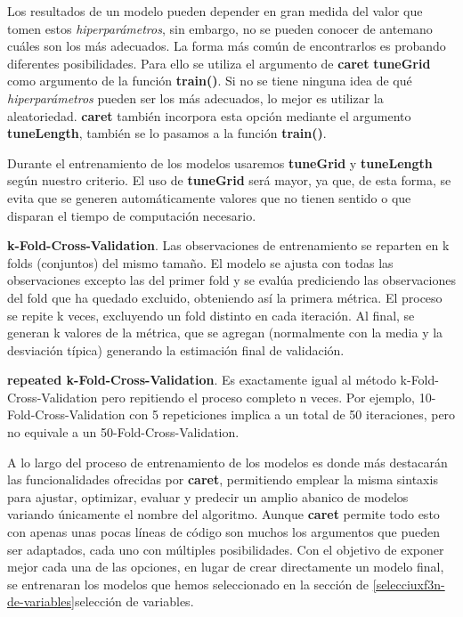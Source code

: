 \documentclass[]{article}
\begin{document}
Los resultados de un modelo pueden depender en gran medida del valor que
tomen estos \emph{hiperparámetros}, sin embargo, no se pueden conocer de
antemano cuáles son los más adecuados. La forma más común de encontrarlos 
es probando diferentes posibilidades. Para ello se
utiliza el argumento de \textbf{caret} \textbf{tuneGrid} como argumento de la función
\textbf{train()}. Si no se tiene ninguna idea de qué 
\emph{hiperparámetros} pueden ser los más adecuados, lo mejor es utilizar la
aleatoriedad. \textbf{caret} también incorpora esta opción mediante el
argumento \textbf{tuneLength}, también se lo pasamos a la función
\textbf{train()}.

Durante el entrenamiento de los modelos usaremos \textbf{tuneGrid} 
y \textbf{tuneLength} según nuestro criterio. El uso de \textbf{tuneGrid} será mayor, ya
que, de esta forma, se evita que se generen automáticamente valores que
no tienen sentido o que disparan el tiempo de computación necesario.

\begin{tcolorbox}
	\textbf{k-Fold-Cross-Validation}. Las observaciones de entrenamiento
	se reparten en k folds (conjuntos) del mismo tamaño. El modelo se ajusta
	con todas las observaciones excepto las del primer fold y se evalúa
	prediciendo las observaciones del fold que ha quedado excluido,
	obteniendo así la primera métrica. El proceso se repite k veces,
	excluyendo un fold distinto en cada iteración. Al final, se generan k
	valores de la métrica, que se agregan (normalmente con la media y la
	desviación típica) generando la estimación final de validación.	
\end{tcolorbox}

\begin{tcolorbox}
	\textbf{repeated k-Fold-Cross-Validation}. Es exactamente
	igual al método k-Fold-Cross-Validation pero repitiendo el proceso
	completo n veces. Por ejemplo, 10-Fold-Cross-Validation con 5
	repeticiones implica a un total de 50 iteraciones,
	pero no equivale a un 50-Fold-Cross-Validation.
\end{tcolorbox}

A lo largo del proceso de entrenamiento de los modelos es donde más destacarán las
funcionalidades ofrecidas por \textbf{caret}, permitiendo emplear la
misma sintaxis para ajustar, optimizar, evaluar y predecir un amplio
abanico de modelos variando únicamente el nombre del algoritmo. Aunque
\textbf{caret} permite todo esto con apenas unas pocas líneas de código
son muchos los argumentos que pueden ser adaptados, cada uno con
múltiples posibilidades. Con el objetivo de exponer mejor cada una de
las opciones, en lugar de crear directamente un modelo final, se
entrenaran los modelos que hemos seleccionado en la sección de 
\ref{selecciuxf3n-de-variables}{selección de variables}.
\end{document}
